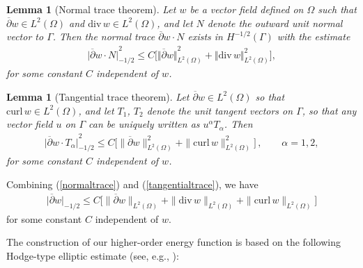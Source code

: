 \documentclass[12pt,twoside,reqno]{amsart}
\numberwithin{equation}{section}
\newtheorem{lemma}[theorem]{Lemma}
\theoremstyle{definition}
\theoremstyle{remark}
\begin{document}
\begin{lemma}[Normal trace theorem]\label{lem: normal trace} Let $w$ be a vector field defined on $\Omega$ such that ${\overline{\partial}} w\in L^2(\Omega)$ and ${\mathrm{div}\,} w\in L^2(\Omega)$, and let $N$ denote the outward unit normal vector to $\Gamma$. Then the normal trace ${\overline{\partial}} w\cdot N$ exists in $H^{-1/2}(\Gamma)$ with the estimate
\begin{align}
	{\vert{{\overline{\partial}} w\cdot N}\vert}_{-1/2}^2 \le C \Big[{\Vert{{\overline{\partial}} w}\Vert}_{L^2(\Omega)}^2 +{\Vert{{\mathrm{div}\,} w}\Vert}_{L^2(\Omega)}^2\Big],\label{normaltrace}
\end{align}
for some constant $C$ independent of $w$.
\end{lemma}

\begin{lemma}[Tangential trace theorem]\label{lem.tangential.trace}
Let ${\overline{\partial}} w\in L^2(\Omega)$ so that ${\mathrm{curl}\,}  w\in L^2(\Omega) $, and let
$T_1$, $T_2$ denote the unit tangent vectors on ${\Gamma}$,
so that any vector field $u$ on ${\Gamma}$ can be uniquely written as $u^\alpha
T_\alpha$. Then
\begin{align}
{\vert{{\overline{\partial}} w\cdot T_\alpha}\vert}_{-1/2}^2 \le C
\Big[\|{\overline{\partial}} w\|^2_{L^2(\Omega)} + \| {\mathrm{curl}\,}
w\|^2_{ L^2(\Omega) }\Big]\,,\qquad\alpha=1,2, \label{tangentialtrace}
\end{align}
for some constant $C$ independent of $w$.
\end{lemma}

Combining (\ref{normaltrace}) and (\ref{tangentialtrace}), we have
\begin{align}
{\vert{{\overline{\partial}} w}\vert}_{-1/2} \le C\Big[\|{\overline{\partial}} w\|_{L^2(\Omega)} + \|{\mathrm{div}\,}
w\|_{L^2(\Omega) } + \|{\mathrm{curl}\,}  w\|_{L^2(\Omega) }\Big]
\label{tracetemp}
\end{align}
for some constant $C$ independent of $w$.

The construction of our higher-order energy function is based on the following Hodge-type elliptic estimate (see, e.g., \cite{CLS10}):
\end{document}
